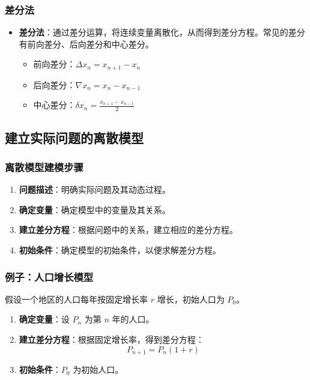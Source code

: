 \documentclass[UTF8]{ctexart}
\begin{document}
\subsubsection {差分法}
\begin{itemize}
    \item \textbf{差分法}：通过差分运算，将连续变量离散化，从而得到差分方程。常见的差分有前向差分、后向差分和中心差分。
    \begin{itemize}
        \item 前向差分：\( \Delta x_n = x_{n+1} - x_n \)
        \item 后向差分：\( \nabla x_n = x_n - x_{n-1} \)
        \item 中心差分：\( \delta x_n = \frac{x_{n+1} - x_{n-1}}{2} \)
    \end{itemize}
\end{itemize}

\subsection {建立实际问题的离散模型}
\subsubsection {离散模型建模步骤}
\begin{enumerate}
    \item \textbf{问题描述}：明确实际问题及其动态过程。
    \item \textbf{确定变量}：确定模型中的变量及其关系。
    \item \textbf{建立差分方程}：根据问题中的关系，建立相应的差分方程。
    \item \textbf{初始条件}：确定模型的初始条件，以便求解差分方程。
\end{enumerate}

\subsubsection {例子：人口增长模型}
假设一个地区的人口每年按固定增长率 \( r \) 增长，初始人口为 \( P_0 \)。
\begin{enumerate}
    \item \textbf{确定变量}：设 \( P_n \) 为第 \( n \) 年的人口。
    \item \textbf{建立差分方程}：根据固定增长率，得到差分方程：
    \[
    P_{n+1} = P_n (1 + r)
    \]
    \item \textbf{初始条件}：\( P_0 \) 为初始人口。
\end{enumerate}
\end{document}
